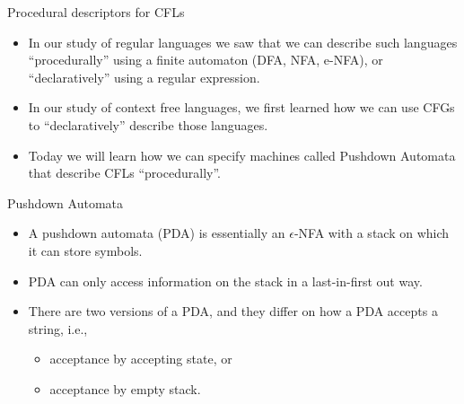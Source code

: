\documentclass{prosper}%
\newcommand{\e} {{\mbox{$\epsilon$}}}
\begin{document}
\begin{slide}{Procedural descriptors for CFLs}
\begin{itemize}
\item In our study of regular languages  we saw that  we can describe such languages ``procedurally'' using a finite automaton (DFA, NFA, e-NFA), or ``declaratively'' using a regular expression.
\item In our study of context free languages, we first learned how we can use CFGs to ``declaratively'' describe those languages.
\item Today we will learn how we can specify machines called {\blue Pushdown Automata} that describe CFLs ``procedurally''.
\end{itemize}
\end{slide}

\begin{slide}{Pushdown Automata}
\begin{itemize}
\item A pushdown automata (PDA) is essentially an \e-NFA with a stack on which it can store symbols.
\item PDA can only access information on the stack in a last-in-first out way. 
\item There are two versions of  a PDA, and they differ on how a PDA accepts a string, i.e.,
\begin{itemize}
\item acceptance by accepting state, or 
\item acceptance by empty stack.%
\end{itemize}
\end{itemize}
\end{slide}
\end{document}
